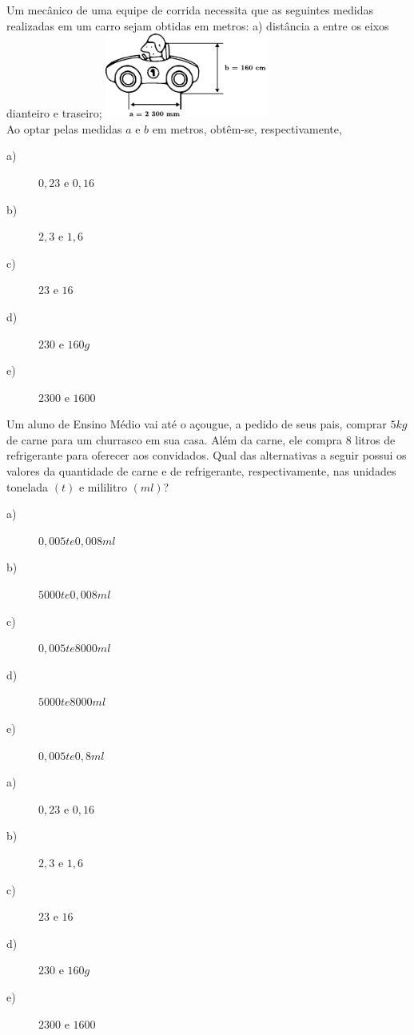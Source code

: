 \newpage

\begin{exercise}[ENEM 2011]
Um mecânico de uma equipe de corrida necessita que as seguintes medidas realizadas em um carro sejam obtidas em metros: a) distância a entre os eixos dianteiro e traseiro;
\includegraphics[width=0.4\textwidth]{imagens/matematicaBasica/sistemaDeUnidades/carro.pdf}\\
Ao optar pelas medidas $a$ e $b$ em metros, obtêm-se, respectivamente,

    \begin{description}
        \item[a)] $0,23 \textrm{ e } 0,16$
        \item[b)] $2,3 \textrm{ e } 1,6$
        \item[c)] $23 \textrm{ e } 16$
        \item[d)] $230 \textrm{ e } 160g$
        \item[e)] $2300 \textrm{ e } 1600$
    \end{description}

\end{exercise}

\begin{exercise}[ENEM 2011]
Um aluno de Ensino Médio vai até o açougue, a pedido de seus pais, comprar $5 kg$ de carne para um churrasco em sua casa. Além da carne, ele compra $8$ litros de refrigerante para oferecer aos convidados. Qual das alternativas a seguir possui os valores da quantidade de carne e de refrigerante, respectivamente, nas unidades tonelada $(t)$ e mililitro $(ml)$?

    \begin{description}
        \item[a)] $0,005 t e 0,008 ml$
        \item[b)] $5000 t e 0,008 ml$
        \item[c)] $0,005 t e 8000 ml$
        \item[d)] $5000 t e 8000 ml$
        \item[e)] $0,005 t e 0,8 ml$
    \end{description}

\end{exercise}
\begin{exercise}[ENEM 2011]


    \begin{description}
        \item[a)] $0,23 \textrm{ e } 0,16$
        \item[b)] $2,3 \textrm{ e } 1,6$
        \item[c)] $23 \textrm{ e } 16$
        \item[d)] $230 \textrm{ e } 160g$
        \item[e)] $2300 \textrm{ e } 1600$
    \end{description}

\end{exercise}